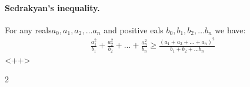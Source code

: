 \documentclass{article}
\begin{document}
\begin{multicols*}{2}
  \paragraph{Sedrakyan's inequality.} For any reals$a_{0},a_{1},a_{2},\ldots a_{n}$ and positive eals $b_{0},b_{1},b_{2},\ldots b_{n}$ we have:  
  \begin{equation*}
    \begin{split}
      \frac{a_{1}^2}{b_{1}}+\frac{a_{2}^2}{b_{2}}+ ...+ \frac{a_{n}^2}{b_{n}} \ge \frac{\left( a_{1}+ a_{2} + ... + a_{n}  \right)^{2}}{b_{1}+b_{2}+... b_{n}}  
    \end{split}
  \end{equation*}<++>
\end{multicols*}{2}
\end{document}
